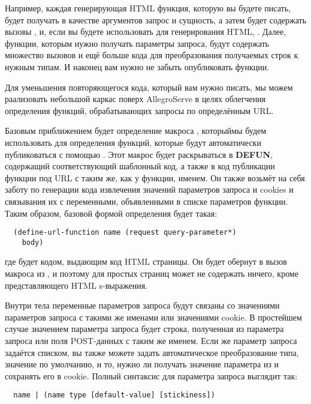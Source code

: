 Например, каждая генерирующая HTML функция, которую вы будете писать, будет получать в
качестве аргументов запрос и сущность, а затем будет содержать вызовы
,  и, если вы будете использовать 
для генерирования HTML, . Далее, функции, которым нужно получать
параметры запроса, будут содержать множество вызовов  и ещё
больше кода для преобразования получаемых строк к нужным типам. И наконец вам нужно не
забыть опубликовать функции.

Для уменьшения повторяющегося кода, который вам нужно писать, мы можем раализовать
небольшой каркас поверх AllegroServe в целях облегчения определения функций,
обрабатывающих запросы по определённым URL.

Базовым приближением будет определение макроса , которыймы будем
использовать для определения функций, которые будут автоматически публиковаться с помощью
. Этот макрос будет раскрываться в \textbf{DEFUN}, содержащий
соответствующий шаблонный код, а также в код публикации функции под URL с таким же, как у
функции, именем. Он также возьмёт на себя заботу по генерации кода извлечения значений
параметров запроса и cookies и связывания их с переменными, объявленными в списке
параметров функции. Таким образом, базовой формой определения 
будет такая:

\begin{lstlisting}
  (define-url-function name (request query-parameter*)
    body)
\end{lstlisting}

где  будет кодом, выдающим код HTML страницы. Он будет обернут в вызов макроса
 из , и поэтому для простых страниц может не содержать ничего, кроме
представляющего HTML s-выражения.

Внутри тела переменные параметров запроса будут связаны со значениями параметров запроса с
такими же именами или значениями cookie. В простейшем случае значением параметра запроса
будет строка, полученная из параметра запроса или поля POST-данных с таким же именем. Если
же параметр запроса задаётся списком, вы также можете задать автоматическое преобразование
типа, значение по умолчанию, и то, нужно ли получать значение параметра из и сохранять его
в cookie. Полный синтаксис для параметра запроса выглядит так:

\begin{verbatim}
  name | (name type [default-value] [stickiness])
\end{verbatim}

